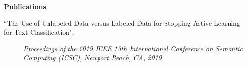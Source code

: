 \documentclass[letterpaper,10pt]{article}
\newcommand{\resheading}[1]{{\large \colorbox{mygrey}{\begin{minipage}{\textwidth}{\textbf{#1 \vphantom{p\^{E}}}}\end{minipage}}}}
\begin{document}
\resheading{Publications}
\begin{description}
\item[``The Use of Unlabeled Data versus Labeled Data for Stopping Active Learning for Text Classification",]
\emph{Proceedings of the 2019 IEEE 13th International Conference on Semantic Computing (ICSC), Newport Beach, CA, 2019.}
\end{description}
\end{document}
